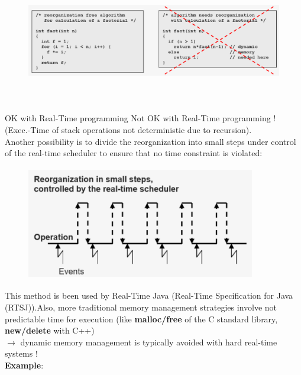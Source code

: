 	\begin{figure}[h]
    \centering
    \includegraphics[width=15cm, height=5.5cm]{Images/image72.png}
    \label{fig:Fig }
    \end{figure}

OK with Real-Time programming   \hspace{1.5cm}   Not OK with Real-Time programming ! (Exec.-Time of stack  operations not deterministic due to recursion). \\


Another possibility is to divide the reorganization into small steps under control of the real-time scheduler to ensure that no time constraint is violated: 

	\begin{figure}[h]
    \centering
    \includegraphics[width=10cm, height=5cm]{Images/image73.png}
    \label{fig:Fig }
    \end{figure}
\newpage
This method is been used by Real-Time Java (Real-Time Specification for Java (RTSJ)).Also, more traditional memory management strategies involve not predictable time for execution (like \textbf{malloc/free} of the C standard library, \textbf{new/delete} with C++)\\

$\rightarrow$ dynamic memory management is typically avoided with hard real-time systems !\\

\textbf{Example}:

